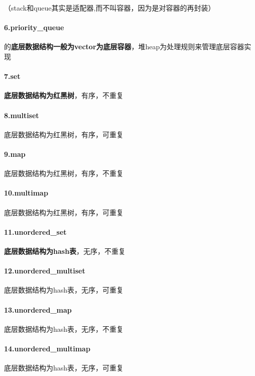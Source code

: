\documentclass[UTF8,a4paper,12pt]{ctexbook}
\begin{document}
		 （stack和queue其实是适配器,而不叫容器，因为是对容器的再封装）
		 
		 \paragraph{6.priority\_queue}     的\textbf{底层数据结构一般为vector为底层容器}，堆heap为处理规则来管理底层容器实现
		 
		 \paragraph{7.set }            \textbf{ 底层数据结构为红黑树}，有序，不重复
		 
		 \paragraph{8.multiset}         底层数据结构为红黑树，有序，可重复 
		 
		 \paragraph{9.map }               底层数据结构为红黑树，有序，不重复
		 
		 \paragraph{10.multimap}    底层数据结构为红黑树，有序，可重复
		 
		 \paragraph{11.unordered\_set }    \textbf{底层数据结构为hash表}，无序，不重复
		 
		 \paragraph{12.unordered\_multiset} 底层数据结构为hash表，无序，可重复 
		 
		 \paragraph{13.unordered\_map}    底层数据结构为hash表，无序，不重复
		 
		 \paragraph{14.unordered\_multimap} 底层数据结构为hash表，无序，可重复  
\end{document}
